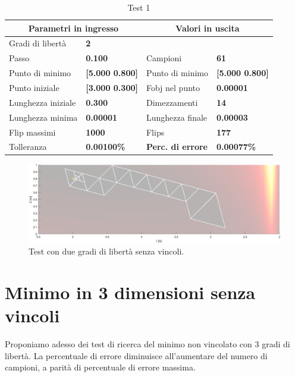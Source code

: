 \documentclass[a4paper, 11pt]{article}
\begin{document}
\begin{table}[h]
\caption{Test 1}
\begin{center}
\begin{tabular}{|l|l|l|l|} 
\hline
\multicolumn{2}{|c|}{\textbf{Parametri in ingresso}} &
\multicolumn{2}{c|}{\textbf {Valori in uscita}} \\ \hline
Gradi di libertà  & \textbf{2} &  &  \\ \hline 
Passo & \textbf{0.100} & Campioni & \textbf{61} \\ \hline 
Punto di minimo & \textbf{{[}5.000 0.800{]}} & Punto di minimo &
\textbf{{[}5.000 0.800{]}} \\ \hline 
Punto iniziale & \textbf{{[}3.000 0.300{]}} & Fobj nel punto & \textbf{0.00001}
\\ \hline 
Lunghezza iniziale & \textbf{0.300} & Dimezzamenti & \textbf{14} \\ \hline 
Lunghezza minima & \textbf{0.00001} & Lunghezza finale & \textbf{0.00003} \\
\hline
Flip massimi & \textbf{1000} & Flips & \textbf{177} \\ \hline 
Tolleranza & \textbf{0.00100\%} & \textbf{Perc. di errore} & \textbf{0.00077\%}
\\ \hline 
\end{tabular} 
\end{center}
\end{table}

\begin{figure}[H]
    \centering
        \includegraphics[width=15cm]{assets/figure10}
        \caption{Test con due gradi di libertà senza vincoli.}
\end{figure}

\section{Minimo in 3 dimensioni senza vincoli}

Proponiamo adesso dei test di ricerca del minimo non vincolato con 3 gradi di
libertà. La percentuale di errore diminuisce all'aumentare del numero di
campioni, a parità di percentuale di errore massima.
\end{document}
